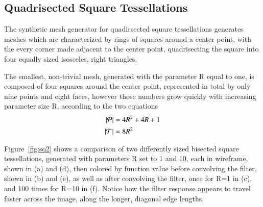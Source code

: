 

%
%
%
%
\pagebreak
\subsection{Quadrisected Square Tessellations}
The synthetic mesh generator for quadirsected square tessellations generates meshes which are characterized by rings of squares around a center point, with the every corner made adjacent to the center point, quadrisecting the square into four equally sized isosceles, right triangles.

The smallest, non-trivial mesh, generated with the parameter R equal to one, is composed of four squares around the center point, represented in total by only nine points and eight faces, however those numbers grow quickly
with increasing parameter size R, according to the two equations
\begin{align}
	|\mathcal{P}| &= 4R^2 + 4R + 1 \\
	|\mathcal{T}| &= 8R^2
	\label{eq:sq2PointAndFaceCounts}
\end{align}


Figure~\ref{fig:sq2} shows a comparison of two differently sized bisected square tessellations, generated with parameters R set to 1 and 10, each in wireframe, shown in (a) and (d), then colored by function value before convolving the filter, shown in (b) and (e), as well as after convolving the filter, once for R=1 in (c), and 100 times for R=10 in (f). Notice how the filter response appears to travel faster across the image, along the longer, diagonal edge lengths.

